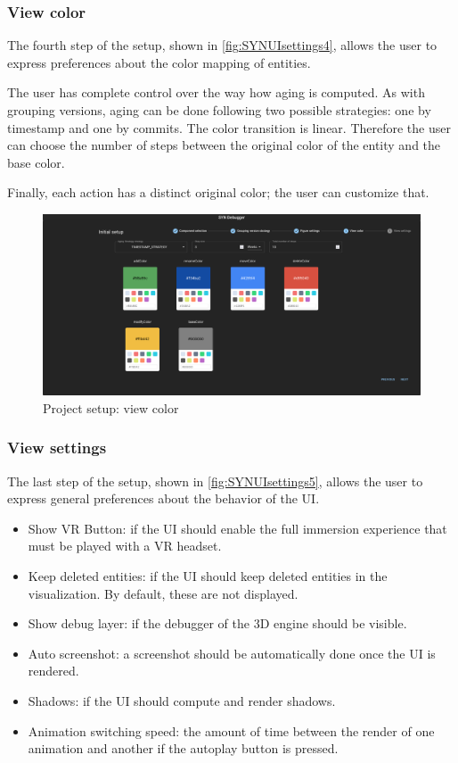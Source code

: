 \subsubsection*{View color}
The fourth step of the setup, shown in \autoref{fig:SYNUIsettings4}, allows the user to express preferences about the color mapping of entities. 

The user has complete control over the way how aging is computed. 
As with grouping versions, aging can be done following two possible strategies: one by timestamp and one by commits. 
The color transition is linear. Therefore the user can choose the number of steps between the original color of the entity and the base color. 

Finally, each action has a distinct original color; the user can customize that. 

\begin{figure}
    \center
    \includegraphics[width=\textwidth]{SYNUI-settings4.png}
    \caption{Project setup: view color}
    \label{fig:SYNUIsettings4}
\end{figure}

\subsubsection*{View settings}
The last step of the setup, shown in \autoref{fig:SYNUIsettings5}, allows the user to express general preferences about the behavior of the UI.

\begin{itemize}
    \item Show VR Button: if the UI should enable the full immersion experience that must be played with a VR headset. 
    \item Keep deleted entities: if the UI should keep deleted entities in the visualization. By default, these are not displayed. 
    \item Show debug layer: if the debugger of the 3D engine should be visible. 
    \item Auto screenshot: a screenshot should be automatically done once the UI is rendered.
    \item Shadows: if the UI should compute and render shadows. 
    \item Animation switching speed: the amount of time between the render of one animation and another if the autoplay button is pressed. 
\end{itemize}

